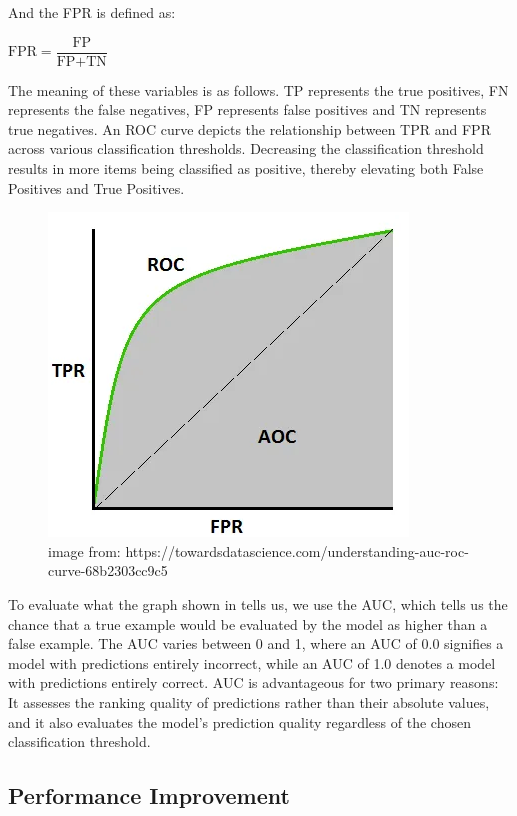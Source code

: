 \documentclass{l4proj}
\begin{document}
\vspace{10mm} 
And the FPR is defined as: 

\begin{center}
    $\text{FPR} = \dfrac{\text{FP}}{\text{FP} + \text{TN}}$
\end{center}

The meaning of these variables is as follows. TP represents the true positives, FN represents the false negatives, FP represents false positives and TN represents true negatives. An ROC curve depicts the relationship between TPR and FPR across various classification thresholds. Decreasing the classification threshold results in more items being classified as positive, thereby elevating both False Positives and True Positives. \\ 

\begin{figure}[h]
    \centering
    \includegraphics[width=0.5\linewidth]{images/roc_auc.png}
    \caption{image from: https://towardsdatascience.com/understanding-auc-roc-curve-68b2303cc9c5}
    \label{fig:roc_auc}
\end{figure}

To evaluate what the graph shown in  tells us, we use the AUC, which tells us the chance that a true example would be evaluated by the model as higher than a false example. The AUC varies between 0 and 1, where an AUC of 0.0 signifies a model with predictions entirely incorrect, while an AUC of 1.0 denotes a model with predictions entirely correct. AUC is advantageous for two primary reasons: It assesses the ranking quality of predictions rather than their absolute values, and it also evaluates the model's prediction quality regardless of the chosen classification threshold. \\

\subsection{Performance Improvement}
\end{document}
